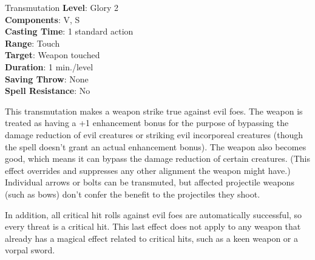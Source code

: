 {Transmutation}
{
	\textbf{Level}: Glory 2\\
	\textbf{Components}: V, S\\
	\textbf{Casting Time}: 1 standard action\\
	\textbf{Range}: Touch\\
	\textbf{Target}: Weapon touched\\
	\textbf{Duration}: 1 min./level\\
	\textbf{Saving Throw}: None\\
	\textbf{Spell Resistance}: No\\
}
{
	This transmutation makes a weapon strike true against evil foes. The weapon is treated as having a +1 enhancement bonus for the purpose of bypassing the damage reduction of evil creatures or striking evil incorporeal creatures (though the spell doesn’t grant an actual enhancement bonus). The weapon also becomes good, which means it can bypass the damage reduction of certain creatures. (This effect overrides and suppresses any other alignment the weapon might have.) Individual arrows or bolts can be transmuted, but affected projectile weapons (such as bows) don’t confer the benefit to the projectiles they shoot.

	In addition, all critical hit rolls against evil foes are automatically successful, so every threat is a critical hit. This last effect does not apply to any weapon that already has a magical effect related to critical hits, such as a keen weapon or a vorpal sword.
}